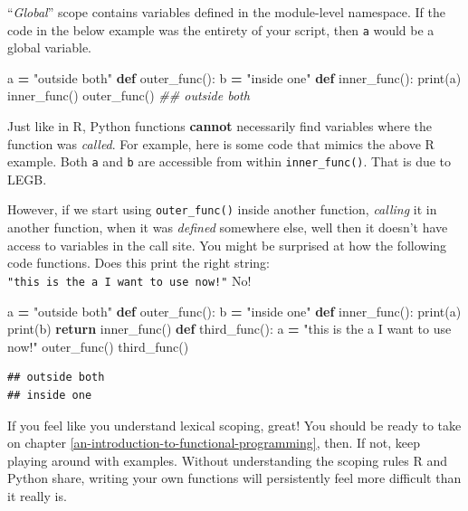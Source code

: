 \documentclass[
  12pt,
  krantz2]{krantz}
\makeatletter
\newenvironment{Shaded}{\begin{snugshade}}{\end{snugshade}}
\newcommand{\BuiltInTok}[1]{#1}
\newcommand{\CommentTok}[1]{\textcolor[rgb]{0.37,0.37,0.37}{\textit{#1}}}
\newcommand{\ControlFlowTok}[1]{\textcolor[rgb]{0.27,0.27,0.27}{\textbf{#1}}}
\newcommand{\KeywordTok}[1]{\textcolor[rgb]{0.27,0.27,0.27}{\textbf{#1}}}
\newcommand{\NormalTok}[1]{#1}
\newcommand{\OperatorTok}[1]{\textcolor[rgb]{0.43,0.43,0.43}{\textbf{#1}}}
\newcommand{\StringTok}[1]{\textcolor[rgb]{0.5,0.5,0.5}{#1}}
\newenvironment{kframe}{%
\medskip{}
\setlength{\fboxsep}{.8em}
 \def\at@end@of@kframe{}%
 \ifinner\ifhmode%
  \def\at@end@of@kframe{\end{minipage}}%
  \begin{minipage}{\columnwidth}%
 \fi\fi%
 \def\FrameCommand##1{\hskip\@totalleftmargin \hskip-\fboxsep
 \colorbox{shadecolor}{##1}\hskip-\fboxsep
     \hskip-\linewidth \hskip-\@totalleftmargin \hskip\columnwidth}%
 \MakeFramed {\advance\hsize-\width
   \@totalleftmargin\z@ \linewidth\hsize
   \@setminipage}}%
 {\par\unskip\endMakeFramed%
 \at@end@of@kframe}
\renewenvironment{Shaded}{\begin{kframe}}{\end{kframe}}
\makeatother
\begin{document}
``\emph{Global}'' scope contains variables defined in the module-level namespace. If the code in the below example was the entirety of your script, then \texttt{a} would be a global variable.

\begin{Shaded}
\begin{Highlighting}[]
\NormalTok{a }\OperatorTok{=} \StringTok{"outside both"}
\KeywordTok{def}\NormalTok{ outer\_func():}
\NormalTok{    b }\OperatorTok{=} \StringTok{"inside one"}
    \KeywordTok{def}\NormalTok{ inner\_func():}
        \BuiltInTok{print}\NormalTok{(a) }
\NormalTok{    inner\_func()}
\NormalTok{outer\_func()}
\CommentTok{\#\# outside both}
\end{Highlighting}
\end{Shaded}

Just like in R, Python functions \textbf{cannot} necessarily find variables where the function was \emph{called}. For example, here is some code that mimics the above R example. Both \texttt{a} and \texttt{b} are accessible from within \texttt{inner\_func()}. That is due to LEGB.

However, if we start using \texttt{outer\_func()} inside another function, \emph{calling} it in another function, when it was \emph{defined} somewhere else, well then it doesn't have access to variables in the call site. You might be surprised at how the following code functions. Does this print the right string: \texttt{"this\ is\ the\ a\ I\ want\ to\ use\ now!"} No!

\begin{Shaded}
\begin{Highlighting}[]
\NormalTok{a }\OperatorTok{=} \StringTok{"outside both"}
\KeywordTok{def}\NormalTok{ outer\_func():}
\NormalTok{    b }\OperatorTok{=} \StringTok{"inside one"}
    \KeywordTok{def}\NormalTok{ inner\_func():}
        \BuiltInTok{print}\NormalTok{(a) }
        \BuiltInTok{print}\NormalTok{(b)}
    \ControlFlowTok{return}\NormalTok{ inner\_func() }
\KeywordTok{def}\NormalTok{ third\_func():}
\NormalTok{    a }\OperatorTok{=} \StringTok{"this is the a I want to use now!"}
\NormalTok{    outer\_func()}
\NormalTok{third\_func() }
\end{Highlighting}
\end{Shaded}

\begin{verbatim}
## outside both
## inside one
\end{verbatim}

If you feel like you understand lexical scoping, great! You should be ready to take on chapter \ref{an-introduction-to-functional-programming}, then. If not, keep playing around with examples. Without understanding the scoping rules R and Python share, writing your own functions will persistently feel more difficult than it really is.
\end{document}
